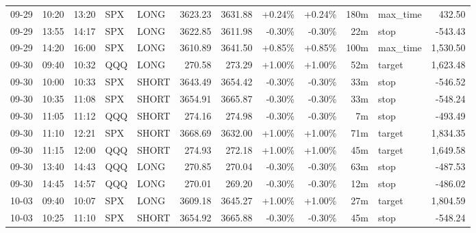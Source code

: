 \documentclass[11pt,a4paper]{article}
\begin{document}
\begin{center}
\begin{longtable}{>{\color{txtmain}}l l l l l r r r r r >{\color{txtmain}}l r}
09-29 & 10:20 & 13:20 & SPX & LONG & 3623.23 & 3631.88 & \textcolor{wingreen}{+0.24\%} & \textcolor{wingreen}{+0.24\%} & 180m & max\_time & \textcolor{wingreen}{432.50} \\
09-29 & 13:55 & 14:17 & SPX & LONG & 3622.85 & 3611.98 & \textcolor{lossred}{-0.30\%} & \textcolor{lossred}{-0.30\%} & 22m & stop & \textcolor{lossred}{-543.43} \\
09-29 & 14:20 & 16:00 & SPX & LONG & 3610.89 & 3641.50 & \textcolor{wingreen}{+0.85\%} & \textcolor{wingreen}{+0.85\%} & 100m & max\_time & \textcolor{wingreen}{1,530.50} \\
09-30 & 09:40 & 10:32 & QQQ & LONG & 270.58 & 273.29 & \textcolor{wingreen}{+1.00\%} & \textcolor{wingreen}{+1.00\%} & 52m & target & \textcolor{wingreen}{1,623.48} \\
09-30 & 10:00 & 10:33 & SPX & SHORT & 3643.49 & 3654.42 & \textcolor{lossred}{-0.30\%} & \textcolor{lossred}{-0.30\%} & 33m & stop & \textcolor{lossred}{-546.52} \\
09-30 & 10:35 & 11:08 & SPX & SHORT & 3654.91 & 3665.87 & \textcolor{lossred}{-0.30\%} & \textcolor{lossred}{-0.30\%} & 33m & stop & \textcolor{lossred}{-548.24} \\
09-30 & 11:05 & 11:12 & QQQ & SHORT & 274.16 & 274.98 & \textcolor{lossred}{-0.30\%} & \textcolor{lossred}{-0.30\%} & 7m & stop & \textcolor{lossred}{-493.49} \\
09-30 & 11:10 & 12:21 & SPX & SHORT & 3668.69 & 3632.00 & \textcolor{wingreen}{+1.00\%} & \textcolor{wingreen}{+1.00\%} & 71m & target & \textcolor{wingreen}{1,834.35} \\
09-30 & 11:15 & 12:00 & QQQ & SHORT & 274.93 & 272.18 & \textcolor{wingreen}{+1.00\%} & \textcolor{wingreen}{+1.00\%} & 45m & target & \textcolor{wingreen}{1,649.58} \\
09-30 & 13:40 & 14:43 & QQQ & LONG & 270.85 & 270.04 & \textcolor{lossred}{-0.30\%} & \textcolor{lossred}{-0.30\%} & 63m & stop & \textcolor{lossred}{-487.53} \\
09-30 & 14:45 & 14:57 & QQQ & LONG & 270.01 & 269.20 & \textcolor{lossred}{-0.30\%} & \textcolor{lossred}{-0.30\%} & 12m & stop & \textcolor{lossred}{-486.02} \\
10-03 & 09:40 & 10:07 & SPX & LONG & 3609.18 & 3645.27 & \textcolor{wingreen}{+1.00\%} & \textcolor{wingreen}{+1.00\%} & 27m & target & \textcolor{wingreen}{1,804.59} \\
10-03 & 10:25 & 11:10 & SPX & SHORT & 3654.92 & 3665.88 & \textcolor{lossred}{-0.30\%} & \textcolor{lossred}{-0.30\%} & 45m & stop & \textcolor{lossred}{-548.24} \\

\end{longtable}
\end{center}
\end{document}
